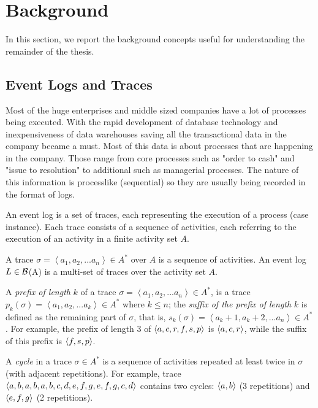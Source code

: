 

\section{Background} %
\label{sec:background}
In this section, we report the background concepts useful for understanding the remainder of the thesis.



\subsection{Event Logs and Traces} \label{logs}

Most of the huge enterprises and middle sized companies have a lot of processes being executed. With the rapid development of database technology and inexpensiveness of data warehouses saving all the transactional data in the company became a must. Most of this data is about processes that are happening in the company. Those range from core processes such as "order to cash" and "issue to resolution" to additional such as managerial processes. The nature of this information is processlike (sequential) so they are usually being recorded in the format of logs. 

An event log is a set of traces, each representing the execution of a process (case instance). Each trace consists of a sequence of activities, each referring to the execution of an activity in a finite activity set $A$.

\begin{definition}
	A trace $\sigma=\left\langle a_1, a_2, ... a_n\right\rangle \in A^*$ over $A$ is a sequence of activities. An event log $L \in \cal{B}$(A) is a multi-set of traces over the activity set $A$.
\end{definition}

A \emph{prefix of length} $k$ of a trace $\sigma=\left\langle a_1, a_2, ... a_n\right\rangle \in A^*$, is a trace $p_k(\sigma)=\left\langle a_1, a_2, ... a_k\right\rangle \in A^*$ where $k \leq n$; the \emph{suffix of the prefix of length} $k$ is defined as the remaining part of $\sigma$, that is, $s_k(\sigma) = \left\langle a_k+1, a_k+2, ... a_n\right\rangle \in A^*$. For example, the prefix of length $3$ of $\langle a,c,r,f,s,p\rangle$ is $\langle a,c,r\rangle$, while the suffix of this prefix is $\langle f,s,p\rangle$.

A \emph{cycle} in a trace $\sigma \in A^*$ is a sequence of activities repeated at least twice in $\sigma$ (with adjacent repetitions). For example, trace $\langle a,b,a,b,a,b,c,d,e,f,g,e,f,g,c,d\rangle$ contains two cycles: $\langle a,b\rangle$ (3 repetitions) and $\langle e,f,g\rangle$ (2 repetitions).

